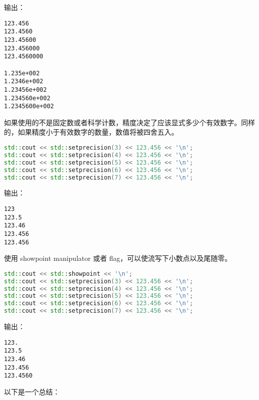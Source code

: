 \documentclass[../../LearnCpp.tex]{subfiles}
\begin{document}
输出：

\begin{lstlisting}
123.456
123.4560
123.45600
123.456000
123.4560000

1.235e+002
1.2346e+002
1.23456e+002
1.234560e+002
1.2345600e+002
\end{lstlisting}

如果使用的不是固定数或者科学计数，精度决定了应该显式多少个有效数字。同样的，如果精度小于有效数字的数量，数值将被四舍五入。

\begin{lstlisting}[language=C++]
std::cout << std::setprecision(3) << 123.456 << '\n';
std::cout << std::setprecision(4) << 123.456 << '\n';
std::cout << std::setprecision(5) << 123.456 << '\n';
std::cout << std::setprecision(6) << 123.456 << '\n';
std::cout << std::setprecision(7) << 123.456 << '\n';
\end{lstlisting}

输出：

\begin{lstlisting}
123
123.5
123.46
123.456
123.456
\end{lstlisting}

使用 showpoint manipulator 或者 flag，可以使流写下小数点以及尾随零。

\begin{lstlisting}[language=C++]
std::cout << std::showpoint << '\n';
std::cout << std::setprecision(3) << 123.456 << '\n';
std::cout << std::setprecision(4) << 123.456 << '\n';
std::cout << std::setprecision(5) << 123.456 << '\n';
std::cout << std::setprecision(6) << 123.456 << '\n';
std::cout << std::setprecision(7) << 123.456 << '\n';
\end{lstlisting}

输出：

\begin{lstlisting}
123.
123.5
123.46
123.456
123.4560
\end{lstlisting}

以下是一个总结：
\end{document}
